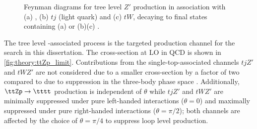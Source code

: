 \documentclass[../thesis.tex]{subfiles}
\begin{document}
\begin{figure}[!htbp]
\centering
{}
\caption[Feynman diagrams for tree level $Z'$ production in association with (a) \ttbar, (b) $tj$ (light quark) and (c) $tW$, decaying to final states containing (a) \tttt or (b)(c) \ttt.]{\label{fig:theory:ttZp_feynman}Feynman diagrams for tree level $Z'$ production in association with (a) \ttbar, (b) $tj$ (light quark) and (c) $tW$, decaying to final states containing (a) \tttt or (b)(c) \ttt \citep{theory:ttZp}.}
\end{figure}

The tree level \ttbar-associated process \ttZp is the targeted production channel for the search in this dissertation. The \ttZp cross-section at \acs{LO} in \acs{QCD} is shown in \autoref{fig:theory:ttZp_limit}. Contributions from the single-top-associated channels $tjZ'$ and $tWZ'$ are not considered due to a smaller cross-section by a factor of two compared to \ttZp due to suppression in the three-body phase space \citep{theory:ttZp}. Additionally, $\ttZp\rightarrow\tttt$ production is independent of $\theta$ while $tjZ'$ and $tWZ'$ are minimally suppressed under pure left-handed interactions ($\theta=0$) and maximally suppressed under pure right-handed interactions ($\theta=\pi/2$); both channels are affected by the choice of $\theta=\pi/4$ to suppress loop level production.
\end{document}
